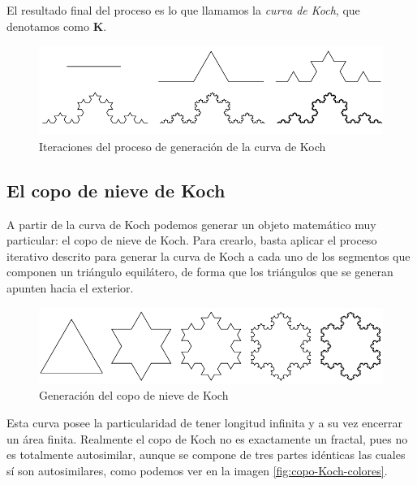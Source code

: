 El resultado final del proceso es lo que llamamos la \textit{curva de Koch}, que denotamos como \textbf{K}.

\begin{figure} [ht]
\centering
\includegraphics[scale = 0.5]{img/curva-Koch.png}
\caption{Iteraciones del proceso de generación de la curva de Koch}
 \label{fig:curva-Koch}
\end{figure}

\subsection{El copo de nieve de Koch}
\label{subsection:copo-Koch}

A partir de la curva de Koch podemos generar un objeto matemático muy particular: el copo de nieve de Koch. Para crearlo, basta aplicar el proceso iterativo descrito para generar la curva de Koch a cada uno de los segmentos que componen un triángulo equilátero, de forma que los triángulos que se generan apunten hacia el exterior.


\begin{figure} [ht]
\centering
\includegraphics[scale = 0.6]{img/copo-Koch.png}
\caption{Generación del copo de nieve de Koch}
\label{fig:copo-Koch}
\end{figure}

Esta curva posee la particularidad de tener longitud infinita y a su vez encerrar un área finita. Realmente el copo de Koch no es exactamente un fractal, pues no es totalmente autosimilar, aunque se compone de tres partes idénticas las cuales sí son autosimilares, como podemos ver en la imagen \ref{fig:copo-Koch-colores}.

